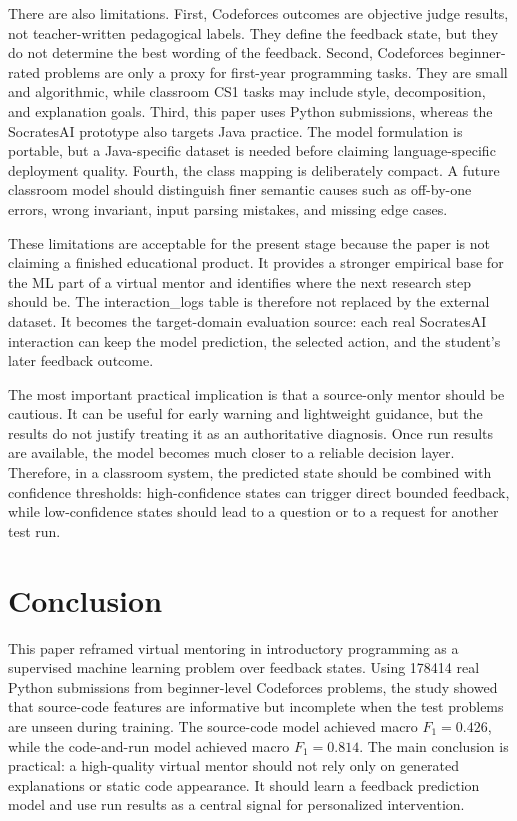 \documentclass[twoside,11pt]{article}
\begin{document}
There are also limitations. First, Codeforces outcomes are objective judge results, not teacher-written pedagogical labels. They define the feedback state, but they do not determine the best wording of the feedback. Second, Codeforces beginner-rated problems are only a proxy for first-year programming tasks. They are small and algorithmic, while classroom CS1 tasks may include style, decomposition, and explanation goals. Third, this paper uses Python submissions, whereas the SocratesAI prototype also targets Java practice. The model formulation is portable, but a Java-specific dataset is needed before claiming language-specific deployment quality. Fourth, the class mapping is deliberately compact. A future classroom model should distinguish finer semantic causes such as off-by-one errors, wrong invariant, input parsing mistakes, and missing edge cases.

These limitations are acceptable for the present stage because the paper is not claiming a finished educational product. It provides a stronger empirical base for the ML part of a virtual mentor and identifies where the next research step should be. The \hbox{interaction\_logs} table is therefore not replaced by the external dataset. It becomes the target-domain evaluation source: each real SocratesAI interaction can keep the model prediction, the selected action, and the student's later feedback outcome.

The most important practical implication is that a source-only mentor should be cautious. It can be useful for early warning and lightweight guidance, but the results do not justify treating it as an authoritative diagnosis. Once run results are available, the model becomes much closer to a reliable decision layer. Therefore, in a classroom system, the predicted state should be combined with confidence thresholds: high-confidence states can trigger direct bounded feedback, while low-confidence states should lead to a question or to a request for another test run.

\section{\large Conclusion}

This paper reframed virtual mentoring in introductory programming as a supervised machine learning problem over feedback states. Using 178414 real Python submissions from beginner-level Codeforces problems, the study showed that source-code features are informative but incomplete when the test problems are unseen during training. The source-code model achieved macro $F_1=0.426$, while the code-and-run model achieved macro $F_1=0.814$. The main conclusion is practical: a high-quality virtual mentor should not rely only on generated explanations or static code appearance. It should learn a feedback prediction model and use run results as a central signal for personalized intervention.
\end{document}
